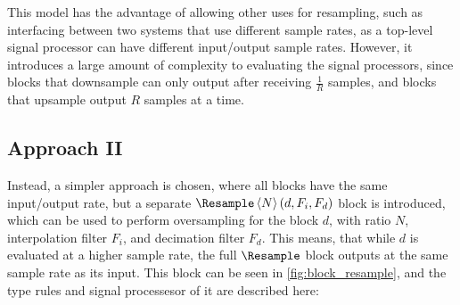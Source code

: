 This model has the advantage of allowing other uses for resampling, such as interfacing between two systems
that use different sample rates, as a top-level signal processor can have different input/output sample
rates. However, it introduces a large amount of complexity to evaluating the signal processors, since blocks
that downsample can only output after receiving $\frac 1 R$ samples, and blocks that upsample
output $R$ samples at a time.

\subsection{Approach II}

Instead, a simpler approach is chosen, where all blocks have the same input/output rate, but a separate
$\Resample\left<N\right>(d, F_i, F_d)$ block is introduced, which can be used to perform oversampling for the block
$d$, with ratio $N$, interpolation filter $F_i$, and
decimation filter $F_d$. This means, that while $d$ is evaluated at a
higher sample rate, the full $\Resample$ block outputs at the same sample rate as its input. This
block can be seen in \autoref{fig:block_resample}, and the type rules and signal processesor of it are described
here:

\begin{prooftree}
\end{prooftree}

\begin{prooftree}
\end{prooftree}

